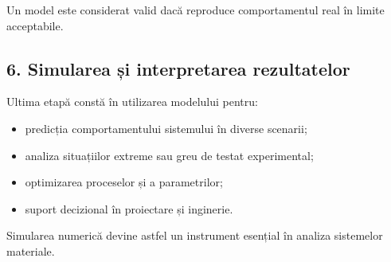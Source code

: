 \documentclass[12pt,a4paper]{article}
\begin{document}
Un model este considerat valid dacă reproduce comportamentul real în limite acceptabile.

\subsection{6. Simularea și interpretarea rezultatelor}

Ultima etapă constă în utilizarea modelului pentru:
\begin{itemize}
    \item predicția comportamentului sistemului în diverse scenarii;
    \item analiza situațiilor extreme sau greu de testat experimental;
    \item optimizarea proceselor și a parametrilor;
    \item suport decizional în proiectare și inginerie.
\end{itemize}

Simularea numerică devine astfel un instrument esențial în analiza sistemelor materiale.
\end{document}
